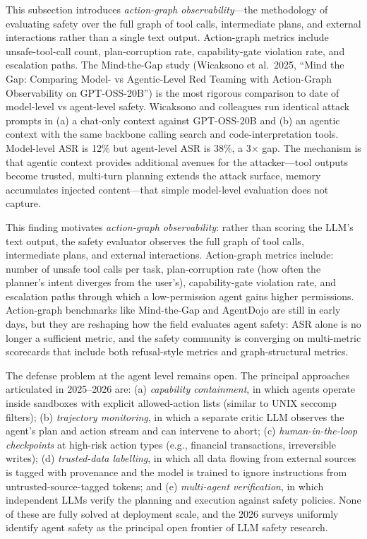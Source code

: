 This subsection introduces \emph{action-graph observability}---the methodology of evaluating safety over the full graph of tool calls, intermediate plans, and external interactions rather than a single text output. Action-graph metrics include unsafe-tool-call count, plan-corruption rate, capability-gate violation rate, and escalation paths. The Mind-the-Gap study (Wicaksono et al.~2025, ``Mind the Gap: Comparing Model- vs Agentic-Level Red Teaming with Action-Graph Observability on GPT-OSS-20B'') is the most rigorous comparison to date of model-level vs agent-level safety. Wicaksono and colleagues run identical attack prompts in (a) a chat-only context against GPT-OSS-20B and (b) an agentic context with the same backbone calling search and code-interpretation tools. Model-level ASR is 12\% but agent-level ASR is 38\%, a 3× gap. The mechanism is that agentic context provides additional avenues for the attacker---tool outputs become trusted, multi-turn planning extends the attack surface, memory accumulates injected content---that simple model-level evaluation does not capture.

This finding motivates \emph{action-graph observability}: rather than scoring the LLM's text output, the safety evaluator observes the full graph of tool calls, intermediate plans, and external interactions. Action-graph metrics include: number of unsafe tool calls per task, plan-corruption rate (how often the planner's intent diverges from the user's), capability-gate violation rate, and escalation paths through which a low-permission agent gains higher permissions. Action-graph benchmarks like Mind-the-Gap and AgentDojo are still in early days, but they are reshaping how the field evaluates agent safety: ASR alone is no longer a sufficient metric, and the safety community is converging on multi-metric scorecards that include both refusal-style metrics and graph-structural metrics.

The defense problem at the agent level remains open. The principal approaches articulated in 2025--2026 are: (a) \emph{capability containment}, in which agents operate inside sandboxes with explicit allowed-action lists (similar to UNIX seccomp filters); (b) \emph{trajectory monitoring}, in which a separate critic LLM observes the agent's plan and action stream and can intervene to abort; (c) \emph{human-in-the-loop checkpoints} at high-risk action types (e.g., financial transactions, irreversible writes); (d) \emph{trusted-data labelling}, in which all data flowing from external sources is tagged with provenance and the model is trained to ignore instructions from untrusted-source-tagged tokens; and (e) \emph{multi-agent verification}, in which independent LLMs verify the planning and execution against safety policies. None of these are fully solved at deployment scale, and the 2026 surveys uniformly identify agent safety as the principal open frontier of LLM safety research.

